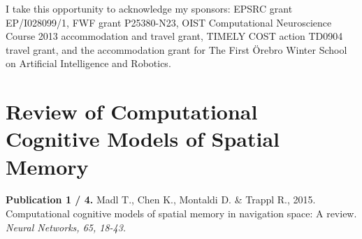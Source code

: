 \documentclass[12pt,PhD,twoside]{muthesis}
\begin{document}
I take this opportunity to acknowledge my sponsors: EPSRC grant EP/I028099/1, FWF grant P25380-N23, OIST Computational Neuroscience Course 2013 accommodation and travel grant, TIMELY COST action TD0904 travel grant, and the accommodation grant for The First {\"O}rebro Winter School on Artificial Intelligence and Robotics. 



\afterpreface






 

\chapter{Review of Computational Cognitive Models of Spatial Memory}
\label{cha:nnreview}

\textbf{Publication 1 / 4.} Madl T., Chen K., Montaldi D. \& Trappl R., 2015. Computational cognitive models of spatial memory in navigation space: A review. \textit{Neural Networks, 65, 18-43.}

\newpage

\addtocounter{page}{-1}


\end{document}
